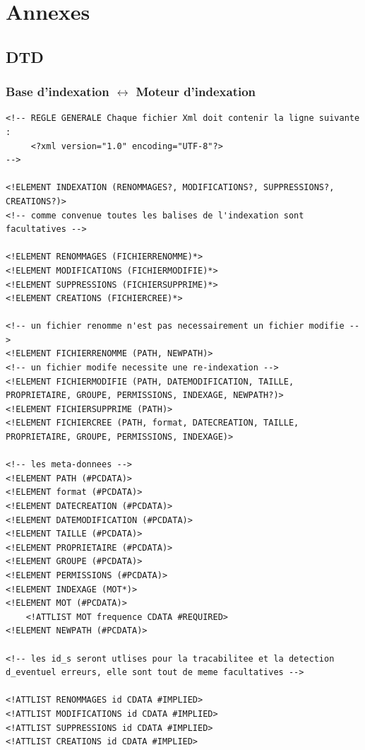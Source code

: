 \chapter{Annexes}

\section{DTD}\label{dtd}

\subsection{Base d'indexation $\leftrightarrow$ Moteur d'indexation}\label{dtd_bi_mi}
\begin{lstlisting}[frame=single]
<!-- REGLE GENERALE Chaque fichier Xml doit contenir la ligne suivante :
     <?xml version="1.0" encoding="UTF-8"?>
-->

<!ELEMENT INDEXATION (RENOMMAGES?, MODIFICATIONS?, SUPPRESSIONS?, CREATIONS?)>
<!-- comme convenue toutes les balises de l'indexation sont facultatives -->

<!ELEMENT RENOMMAGES (FICHIERRENOMME)*>
<!ELEMENT MODIFICATIONS (FICHIERMODIFIE)*>
<!ELEMENT SUPPRESSIONS (FICHIERSUPPRIME)*>
<!ELEMENT CREATIONS (FICHIERCREE)*>

<!-- un fichier renomme n'est pas necessairement un fichier modifie -->
<!ELEMENT FICHIERRENOMME (PATH, NEWPATH)>
<!-- un fichier modife necessite une re-indexation -->
<!ELEMENT FICHIERMODIFIE (PATH, DATEMODIFICATION, TAILLE, PROPRIETAIRE, GROUPE, PERMISSIONS, INDEXAGE, NEWPATH?)>
<!ELEMENT FICHIERSUPPRIME (PATH)>
<!ELEMENT FICHIERCREE (PATH, format, DATECREATION, TAILLE, PROPRIETAIRE, GROUPE, PERMISSIONS, INDEXAGE)>

<!-- les meta-donnees -->
<!ELEMENT PATH (#PCDATA)>
<!ELEMENT format (#PCDATA)>
<!ELEMENT DATECREATION (#PCDATA)>
<!ELEMENT DATEMODIFICATION (#PCDATA)>
<!ELEMENT TAILLE (#PCDATA)>
<!ELEMENT PROPRIETAIRE (#PCDATA)>
<!ELEMENT GROUPE (#PCDATA)>
<!ELEMENT PERMISSIONS (#PCDATA)>
<!ELEMENT INDEXAGE (MOT*)>
<!ELEMENT MOT (#PCDATA)>
	<!ATTLIST MOT frequence CDATA #REQUIRED>
<!ELEMENT NEWPATH (#PCDATA)>

<!-- les id_s seront utlises pour la tracabilitee et la detection d_eventuel erreurs, elle sont tout de meme facultatives -->

<!ATTLIST RENOMMAGES id CDATA #IMPLIED>
<!ATTLIST MODIFICATIONS id CDATA #IMPLIED>
<!ATTLIST SUPPRESSIONS id CDATA #IMPLIED>
<!ATTLIST CREATIONS id CDATA #IMPLIED>
\end{lstlisting}

